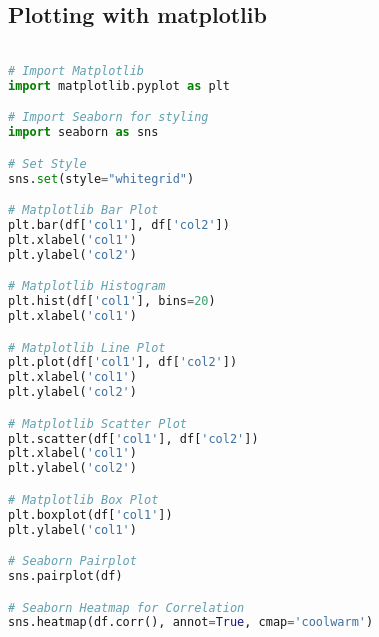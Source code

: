\documentclass[english, threecolumn]{latex4ei/latex4ei_sheet}
\begin{document}
\begin{sectionbox}
\subsection{Plotting with matplotlib}
\begin{lstlisting}[language=Python, gobble=0]

# Import Matplotlib
import matplotlib.pyplot as plt

# Import Seaborn for styling
import seaborn as sns

# Set Style
sns.set(style="whitegrid")

# Matplotlib Bar Plot
plt.bar(df['col1'], df['col2'])
plt.xlabel('col1')
plt.ylabel('col2')

# Matplotlib Histogram
plt.hist(df['col1'], bins=20)
plt.xlabel('col1')

# Matplotlib Line Plot
plt.plot(df['col1'], df['col2'])
plt.xlabel('col1')
plt.ylabel('col2')

# Matplotlib Scatter Plot
plt.scatter(df['col1'], df['col2'])
plt.xlabel('col1')
plt.ylabel('col2')

# Matplotlib Box Plot
plt.boxplot(df['col1'])
plt.ylabel('col1')

# Seaborn Pairplot
sns.pairplot(df)

# Seaborn Heatmap for Correlation
sns.heatmap(df.corr(), annot=True, cmap='coolwarm')
\end{lstlisting}
\end{sectionbox}

\end{document}
